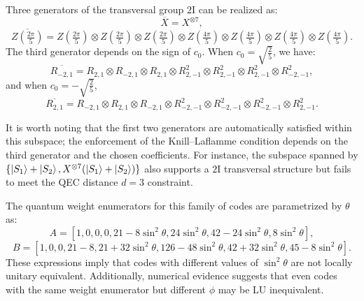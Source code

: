 \documentclass[8pt]{article}
\theoremstyle{definition}
\begin{document}
Three generators of the transversal group \(2\mathrm{I}\) can be realized as:
\[ \overline{X}=X^{\otimes7}, \]
\[ \overline{Z\left(\tfrac{2\pi}{5}\right)}=Z\left(\tfrac{2\pi}{5}\right)\otimes Z\left(\tfrac{2\pi}{5}\right)\otimes Z\left(\tfrac{2\pi}{5}\right)\otimes Z\left(\tfrac{4\pi}{5}\right)\otimes Z\left(\tfrac{4\pi}{5}\right)\otimes Z\left(\tfrac{4\pi}{5}\right)\otimes Z\left(\tfrac{4\pi}{5}\right). \]
The third generator depends on the sign of \(c_0\). When \(c_0 = \sqrt{\tfrac{2}{5}}\), we have:
\[ \overline{R_{-2,1}}=R_{2,1}\otimes R_{-2,1}\otimes R_{2,1}\otimes R_{2,-1}^{2}\otimes R_{2,-1}^{2}\otimes R_{2,-1}^{2}\otimes R_{-2,-1}^{2}, \]
and when $c_{0}=-\sqrt{\frac{2}{5}}$,
\[ \overline{R_{2,1}}=R_{-2,1}\otimes R_{2,1}\otimes R_{-2,1}\otimes R_{-2,-1}^{2}\otimes R_{-2,-1}^{2}\otimes R_{-2,-1}^{2}\otimes R_{2,-1}^{2}. \]

It is worth noting that the first two generators are automatically satisfied within this subspace; the enforcement of the Knill–Laflamme condition depends on the third generator and the chosen coefficients. For instance, the subspace spanned by \(\{\ket{S_1} + \ket{S_2}, X^{\otimes 7}(\ket{S_1} + \ket{S_2})\}\) also supports a \(2\mathrm{I}\) transversal structure but fails to meet the QEC distance \(d=3\) constraint.

The quantum weight enumerators for this family of codes are parametrized by \(\theta\) as:
\[ A=\left[1,0,0,0,21-8\sin^{2}\theta,24\sin^{2}\theta,42-24\sin^{2}\theta,8\sin^{2}\theta\right], \]
\[ B=\left[1,0,0,21-8,21+32\sin^{2}\theta,126-48\sin^{2}\theta,42+32\sin^{2}\theta,45-8\sin^{2}\theta\right].\]
These expressions imply that codes with different values of \(\sin^2\theta\) are not locally unitary equivalent. Additionally, numerical evidence suggests that even codes with the same weight enumerator but different \(\phi\) may be LU inequivalent.
\end{document}
